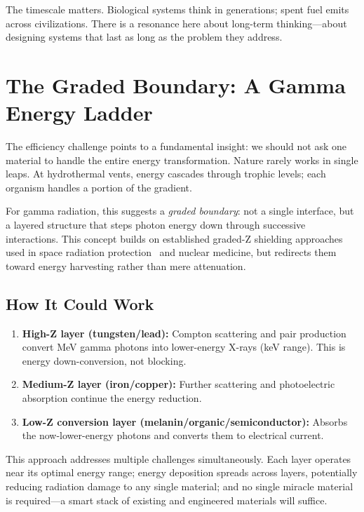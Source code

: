 \documentclass[12pt]{article}
\begin{document}
The timescale matters. Biological systems think in generations; spent fuel emits across
civilizations. There is a resonance here about long-term thinking---about designing
systems that last as long as the problem they address.

\section{The Graded Boundary: A Gamma Energy Ladder}
\label{sec:graded}

The efficiency challenge points to a fundamental insight: we should not ask one material
to handle the entire energy transformation. Nature rarely works in single leaps. At
hydrothermal vents, energy cascades through trophic levels; each organism handles a
portion of the gradient.

For gamma radiation, this suggests a \emph{graded boundary}: not a single interface, but
a layered structure that steps photon energy down through successive interactions. This
concept builds on established graded-Z shielding approaches used in space radiation
protection~\cite{atwell2013} and nuclear medicine, but redirects them toward energy
harvesting rather than mere attenuation.

\subsection*{How It Could Work}

\begin{enumerate}
    \item \textbf{High-Z layer (tungsten/lead):} Compton scattering and pair production
    convert MeV gamma photons into lower-energy X-rays (keV range). This is energy
    down-conversion, not blocking.

    \item \textbf{Medium-Z layer (iron/copper):} Further scattering and photoelectric
    absorption continue the energy reduction.

    \item \textbf{Low-Z conversion layer (melanin/organic/semiconductor):} Absorbs the
    now-lower-energy photons and converts them to electrical current.
\end{enumerate}

This approach addresses multiple challenges simultaneously. Each layer operates near its
optimal energy range; energy deposition spreads across layers, potentially reducing
radiation damage to any single material; and no single miracle material is required---a
smart stack of existing and engineered materials will suffice.
\end{document}
